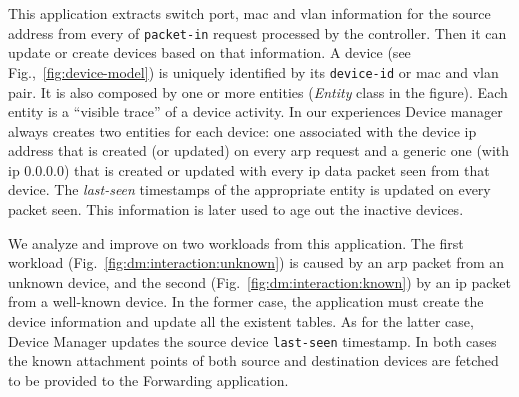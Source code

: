 \begin{figure}[ht]
\TopFloatBoxes
\begin{floatrow}

\end{floatrow}
\end{figure}

This application extracts  switch port, \gls{mac} and \gls{vlan} information for the source address from every \gls{of} \texttt{packet-in} request processed by the controller. 
Then it can update or create devices based on that information. 
A device (see Fig.,~\ref{fig:device-model}) is uniquely identified by its \texttt{device-id} or \gls{mac} and \gls{vlan} pair.
It is also composed by one or more entities (\emph{Entity} class in the figure). 
Each entity is a ``visible trace'' of a device activity. 
In our experiences Device manager always creates two entities for each device: one associated with the device \gls{ip} address that is created (or updated) on every \gls{arp} request and a generic one (with ip 0.0.0.0) that is created or updated with every \gls{ip} data packet seen from that device. The \emph{last-seen} timestamps of the appropriate  entity is updated on every packet seen. This information is later used to age out the inactive devices. 

We analyze and improve on two workloads from this application. 
The first workload (Fig.~\ref{fig:dm:interaction:unknown})  is caused by an \gls{arp} packet from an unknown device,  and the second (Fig.~\ref{fig:dm:interaction:known}) by an \gls{ip} packet from a well-known device. 
In the former case, the application must create the device information and update all the existent tables. As for the latter case, Device Manager updates the source device \texttt{last-seen} timestamp. 
In both cases the known attachment points of both source and destination devices  are fetched  to be provided  to the Forwarding application. 

